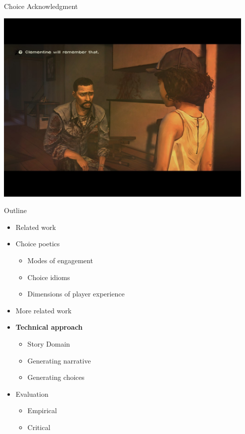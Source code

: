 \documentclass[xcolor=x11names]{beamer}
\begin{document}
\begin{frame}{Choice Acknowledgment}
\begin{center}
  \vspace*{-5pt}
  \includegraphics[width=0.95\textwidth]{res/clem-will-remember.jpg}
\end{center}
\end{frame}

\begin{frame}{Outline}
  \begin{itemize}
    \item Related work
    \item Choice poetics
    \begin{itemize}
      \item Modes of engagement
      \item Choice idioms
      \item Dimensions of player experience
    \end{itemize}
    \item More related work
    \item \textbf{Technical approach}
    \begin{itemize}
      \item Story Domain
      \item Generating narrative
      \item Generating choices
    \end{itemize}
    \item Evaluation
    \begin{itemize}
      \item Empirical
      \item Critical
    \end{itemize}
  \end{itemize}
\end{frame}
\end{document}
